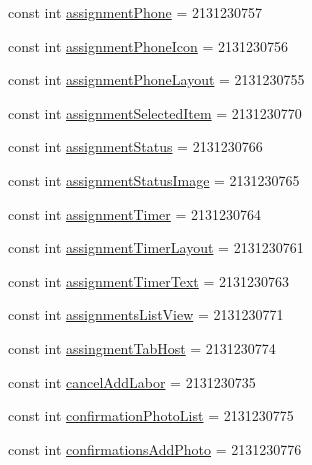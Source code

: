 \begin{DoxyCompactItemize}
\item 
const int \hyperlink{class_field_service_1_1_android_1_1_resource_1_1_id_aa89b4bcdeaafaa1c08d384bf90d72e46}{assignment\+Phone} = 2131230757
\item 
const int \hyperlink{class_field_service_1_1_android_1_1_resource_1_1_id_afc793ddf9c6cd812bd406cd7578378d4}{assignment\+Phone\+Icon} = 2131230756
\item 
const int \hyperlink{class_field_service_1_1_android_1_1_resource_1_1_id_a75c4ad342da97a0ff37129f22ab506d5}{assignment\+Phone\+Layout} = 2131230755
\item 
const int \hyperlink{class_field_service_1_1_android_1_1_resource_1_1_id_acd54e498572ae6534d0d4420971b0f9c}{assignment\+Selected\+Item} = 2131230770
\item 
const int \hyperlink{class_field_service_1_1_android_1_1_resource_1_1_id_a7b1d21e1a0a0bcab31d91f5c2d4d5a90}{assignment\+Status} = 2131230766
\item 
const int \hyperlink{class_field_service_1_1_android_1_1_resource_1_1_id_a785ad3ee080689e1eca0b52e062102a8}{assignment\+Status\+Image} = 2131230765
\item 
const int \hyperlink{class_field_service_1_1_android_1_1_resource_1_1_id_aae72bb47e82536faf2a60b0ab826ec18}{assignment\+Timer} = 2131230764
\item 
const int \hyperlink{class_field_service_1_1_android_1_1_resource_1_1_id_a8d3a2a7e2c72397d1a71a907e1770273}{assignment\+Timer\+Layout} = 2131230761
\item 
const int \hyperlink{class_field_service_1_1_android_1_1_resource_1_1_id_a0492444125696aa9083f690e9fba3c12}{assignment\+Timer\+Text} = 2131230763
\item 
const int \hyperlink{class_field_service_1_1_android_1_1_resource_1_1_id_a54d2be275a8dc3fdd5a3160985cf024f}{assignments\+List\+View} = 2131230771
\item 
const int \hyperlink{class_field_service_1_1_android_1_1_resource_1_1_id_a693b2d2288589d5683d4153714c9900e}{assingment\+Tab\+Host} = 2131230774
\item 
const int \hyperlink{class_field_service_1_1_android_1_1_resource_1_1_id_acb95a9765c3829ffe4857a56862a3a61}{cancel\+Add\+Labor} = 2131230735
\item 
const int \hyperlink{class_field_service_1_1_android_1_1_resource_1_1_id_a0d6022c36ae2d317a242f110d6bab077}{confirmation\+Photo\+List} = 2131230775
\item 
const int \hyperlink{class_field_service_1_1_android_1_1_resource_1_1_id_aa75e68f79577f7d3d531d42f62536286}{confirmations\+Add\+Photo} = 2131230776

\end{DoxyCompactItemize}
